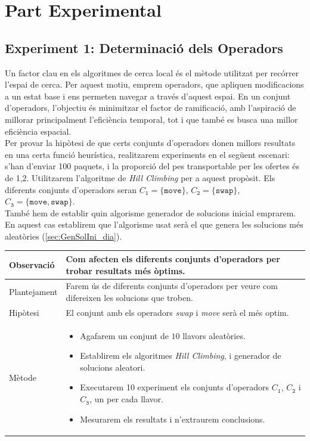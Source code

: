 \documentclass[a4paper]{article}
\begin{document}
	\newpage
	\section{Part Experimental}
	
	\subsection{Experiment 1: Determinació dels Operadors}
	\label{sec:exp1}
	
	Un factor clau en els algoritmes de cerca local és el mètode utilitzat per recórrer l'espai de cerca. Per aquest motiu, emprem operadors, que apliquen modificacions a un estat base i ens permeten navegar a través d'aquest espai. En un conjunt d'operadors, l'objectiu és minimitzar el factor de ramificació, amb l'aspiració de millorar principalment l'eficiència temporal, tot i que també es busca una millor eficiència espacial. \\
	
	Per provar la hipòtesi de que certs conjunts d'operadors donen millors resultats en una certa funció heurística, realitzarem experiments en el següent escenari: s'han d'enviar 100 paquets, i la proporció del pes transportable per les ofertes és de 1,2. Utilitzarem l'algoritme de \textit{Hill Climbing} per a aquest propòsit. Els diferents conjunts d'operadors seran $C_{\texttt{1}} = \{\texttt{move}\}$, $C_{\texttt{2}} = \{\texttt{swap}\}$, $C_{\texttt{3}} = \{\texttt{move}, \texttt{swap}\}$. \\
	
	També hem de establir quin algorisme generador de solucions inicial emprarem. En aquest cas establirem que l'algorisme usat serà el que genera les solucions més aleatòries (\ref{sec:GenSolIni_dia}).
	
	\begin{table}[ht]
		\centering
		\begin{tabular}{|l|p{10cm}|}
			\hline
			Observació & Com afecten els diferents conjunts d'operadors per trobar resultats més òptims. \\
			\hline
			Plantejament & Farem ús de diferents conjunts d'operadors per veure com difereixen les solucions que troben. \\
			\hline
			Hipòtesi & El conjunt amb els operadors \textit{swap} i \textit{move} serà el més optim. \\
			\hline
			Mètode & 
			\begin{itemize}
				\item Agafarem un conjunt de $10$ llavors aleatòries.
				\item Establirem els algoritmes \textit{Hill Climbing}, i generador de solucions aleatori.
				\item Executarem 10 experiment els conjunts d'operadors $C_{\texttt{1}}$, $C_{\texttt{2}}$ i $C_{\texttt{3}}$, un per cada llavor.
				\item Mesurarem els resultats i n'extraurem conclusions.
			\end{itemize} \\
			\hline
		\end{tabular}
		\label{tab:exp1_apartats}
	\end{table}
	
\end{document}
